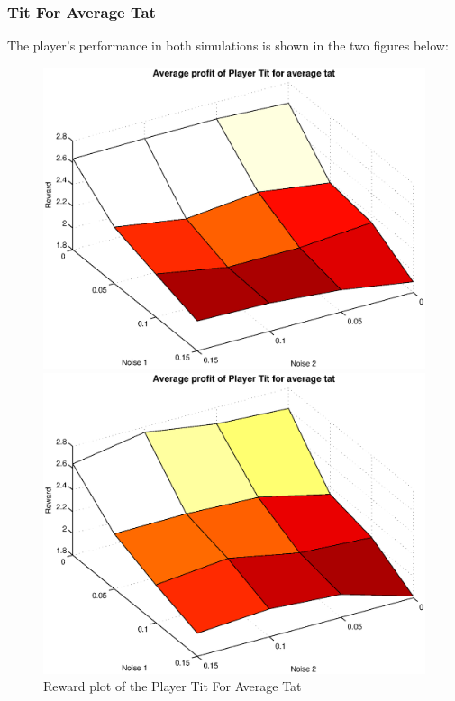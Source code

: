 \documentclass[11pt,twoside]{article}
\begin{document}
\subsubsection{Tit For Average Tat}
The player's performance in both simulations is shown in the two figures below:
\begin{figure}[h]

\begin{minipage}[hbt]{0.65\textwidth}
	\centering
	\includegraphics[width=\textwidth]{pics/simulation1/Reward_vs_Noise_of_Player_Tit_for_average_tat}
\end{minipage}
\hfill
\begin{minipage}[hbt]{0.3\textwidth}
	\centering
	\includegraphics[width=\textwidth]{pics/simulation2/Reward_vs_Noise_of_Player_Tit_for_average_tat}
\end{minipage}
	\caption{Reward plot of the Player Tit For Average Tat}
	\label{pic player tfat}
\end{figure}
\end{document}
